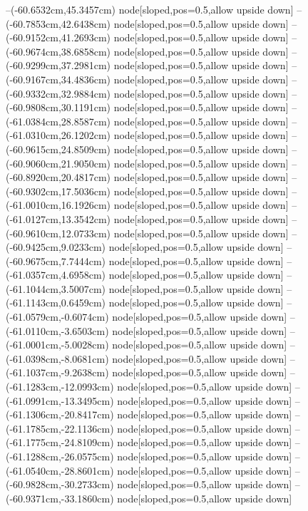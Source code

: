 --(-60.6532cm,45.3457cm) node[sloped,pos=0.5,allow upside down]{\ArrowIn}
--(-60.7853cm,42.6438cm) node[sloped,pos=0.5,allow upside down]{\ArrowIn}
--(-60.9152cm,41.2693cm) node[sloped,pos=0.5,allow upside down]{\ArrowIn}
--(-60.9674cm,38.6858cm) node[sloped,pos=0.5,allow upside down]{\ArrowIn}
--(-60.9299cm,37.2981cm) node[sloped,pos=0.5,allow upside down]{\ArrowIn}
--(-60.9167cm,34.4836cm) node[sloped,pos=0.5,allow upside down]{\ArrowIn}
--(-60.9332cm,32.9884cm) node[sloped,pos=0.5,allow upside down]{\ArrowIn}
--(-60.9808cm,30.1191cm) node[sloped,pos=0.5,allow upside down]{\ArrowIn}
--(-61.0384cm,28.8587cm) node[sloped,pos=0.5,allow upside down]{\ArrowIn}
--(-61.0310cm,26.1202cm) node[sloped,pos=0.5,allow upside down]{\ArrowIn}
--(-60.9615cm,24.8509cm) node[sloped,pos=0.5,allow upside down]{\ArrowIn}
--(-60.9060cm,21.9050cm) node[sloped,pos=0.5,allow upside down]{\ArrowIn}
--(-60.8920cm,20.4817cm) node[sloped,pos=0.5,allow upside down]{\ArrowIn}
--(-60.9302cm,17.5036cm) node[sloped,pos=0.5,allow upside down]{\ArrowIn}
--(-61.0010cm,16.1926cm) node[sloped,pos=0.5,allow upside down]{\ArrowIn}
--(-61.0127cm,13.3542cm) node[sloped,pos=0.5,allow upside down]{\ArrowIn}
--(-60.9610cm,12.0733cm) node[sloped,pos=0.5,allow upside down]{\ArrowIn}
--(-60.9425cm,9.0233cm) node[sloped,pos=0.5,allow upside down]{\ArrowIn}
--(-60.9675cm,7.7444cm) node[sloped,pos=0.5,allow upside down]{\ArrowIn}
--(-61.0357cm,4.6958cm) node[sloped,pos=0.5,allow upside down]{\ArrowIn}
--(-61.1044cm,3.5007cm) node[sloped,pos=0.5,allow upside down]{\ArrowIn}
--(-61.1143cm,0.6459cm) node[sloped,pos=0.5,allow upside down]{\ArrowIn}
--(-61.0579cm,-0.6074cm) node[sloped,pos=0.5,allow upside down]{\ArrowIn}
--(-61.0110cm,-3.6503cm) node[sloped,pos=0.5,allow upside down]{\ArrowIn}
--(-61.0001cm,-5.0028cm) node[sloped,pos=0.5,allow upside down]{\ArrowIn}
--(-61.0398cm,-8.0681cm) node[sloped,pos=0.5,allow upside down]{\ArrowIn}
--(-61.1037cm,-9.2638cm) node[sloped,pos=0.5,allow upside down]{\ArrowIn}
--(-61.1283cm,-12.0993cm) node[sloped,pos=0.5,allow upside down]{\ArrowIn}
--(-61.0991cm,-13.3495cm) node[sloped,pos=0.5,allow upside down]{\ArrowIn}
--(-61.1306cm,-20.8417cm) node[sloped,pos=0.5,allow upside down]{\ArrowIn}
--(-61.1785cm,-22.1136cm) node[sloped,pos=0.5,allow upside down]{\ArrowIn}
--(-61.1775cm,-24.8109cm) node[sloped,pos=0.5,allow upside down]{\ArrowIn}
--(-61.1288cm,-26.0575cm) node[sloped,pos=0.5,allow upside down]{\ArrowIn}
--(-61.0540cm,-28.8601cm) node[sloped,pos=0.5,allow upside down]{\ArrowIn}
--(-60.9828cm,-30.2733cm) node[sloped,pos=0.5,allow upside down]{\ArrowIn}
--(-60.9371cm,-33.1860cm) node[sloped,pos=0.5,allow upside down]{\ArrowIn}
